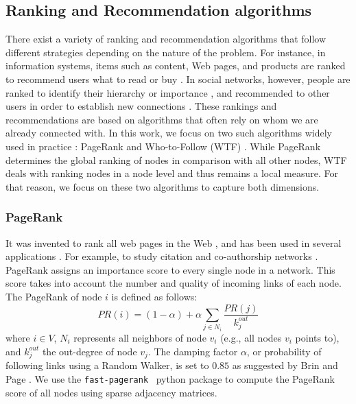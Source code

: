 \documentclass[fleqn,10pt]{wlscirep}
\begin{document}
\subsection*{Ranking and Recommendation algorithms}
There exist a variety of ranking and recommendation algorithms that follow different strategies depending on the nature of the problem. For instance, in information systems, items such as content, Web pages, and products are ranked to recommend users what to read or buy \cite{lofgren2016personalized}. In social networks, however, people are ranked to identify their hierarchy or importance \cite{ding2009pagerank, gollapalli2011ranking,senanayake2015pagerank}, and recommended to other users in order to establish new connections \cite{barbieri2014follow, yu2014link, morone2015influence, zhang2016identifying}.
These rankings and recommendations are based on algorithms that often rely on whom we are already connected with.
In this work, we focus on two such algorithms widely used in practice \cite{gleich2015pagerank}: PageRank \cite{page1999pagerank} and Who-to-Follow (WTF) \cite{gupta2013wtf}. While PageRank determines the global ranking of nodes in comparison with all other nodes,  WTF deals with ranking nodes in a node level and thus remains a local measure. For that reason, we focus on these two algorithms to capture both dimensions.

\subsubsection*{PageRank}
It was invented to rank all web pages in the Web \cite{page1999pagerank}, and has been used in several applications \cite{gleich2015pagerank}. For example, to study citation and co-authorship networks \cite{liu2005co, jezek2008exploration, fiala2008pagerank}.
PageRank assigns an importance score to every single node in a network. This score takes into account the number and quality of incoming links of each node. 
The PageRank of node $i$ is defined as follows:
\begin{equation}
    PR(i) = (1-\alpha) + \alpha \sum_{j \in N_i} \frac{PR(j)}{k^{out}_j}
\end{equation}
where $i\in V$, $N_i$ represents all neighbors of node $v_i$ (e.g., all nodes $v_i$ points to), and $k^{out}_j$ the out-degree of node $v_j$. The damping factor $\alpha$, or probability of following links using a Random Walker, is set to $0.85$ as suggested by Brin and Page \cite{brin1998anatomy}. We use the \texttt{fast-pagerank}~\cite{fast-pagerank} python package to compute the PageRank score of all nodes using sparse adjacency matrices.
\end{document}
